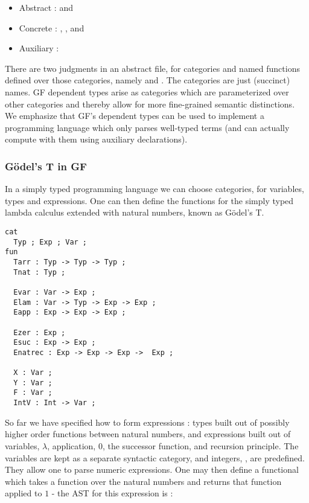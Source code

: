 \begin{itemize}[noitemsep]
  \item Abstract :  and 
  \item Concrete : , , and 
  \item Auxiliary : 
\end{itemize}

There are two judgments in an abstract file, for categories and named functions
defined over those categories, namely  and . The categories
are just (succinct) names. GF dependent types arise as categories which are
parameterized over other categories and thereby allow for more fine-grained
semantic distinctions. We emphasize that GF's dependent types can be used to
implement a programming language which only parses well-typed terms (and can
actually compute with them using auxiliary declarations).

\subsubsection{Gödel's T in GF} \label{godel}

In a simply typed programming language we can choose categories, for variables,
types and expressions. One can then define the functions for the simply typed
lambda calculus extended with natural numbers, known as Gödel's T.

\begin{verbatim} 
cat
  Typ ; Exp ; Var ;
fun
  Tarr : Typ -> Typ -> Typ ;
  Tnat : Typ ;

  Evar : Var -> Exp ;
  Elam : Var -> Typ -> Exp -> Exp ;
  Eapp : Exp -> Exp -> Exp ;

  Ezer : Exp ;
  Esuc : Exp -> Exp ;
  Enatrec : Exp -> Exp -> Exp ->  Exp ;

  X : Var ;
  Y : Var ;
  F : Var ;
  IntV : Int -> Var ;
\end{verbatim}

So far we have specified how to form expressions : types built out of possibly
higher order functions between natural numbers, and expressions built out of
variables, $\lambda$, application, $0$, the successor function, and recursion
principle. The variables are kept as a separate syntactic category, and
integers, , are predefined. They allow one to
parse numeric expressions. One may then define a functional which takes a
function over the natural numbers and returns that function applied to $1$ - the
AST for this expression is :

